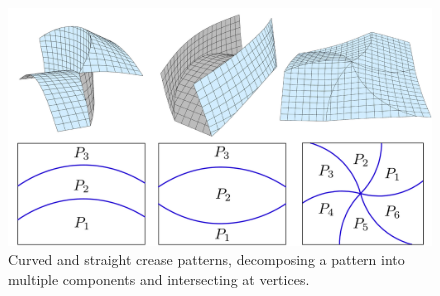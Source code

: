 
\begin{figure} [h]
	\centering
	\includegraphics[width=0.7\linewidth]{figures/multiple_crease_patterns}
	\caption{Curved and straight crease patterns, decomposing a pattern into multiple components and intersecting at vertices.}
	\label{fig:multiple_crease_pattern}
\end{figure}
